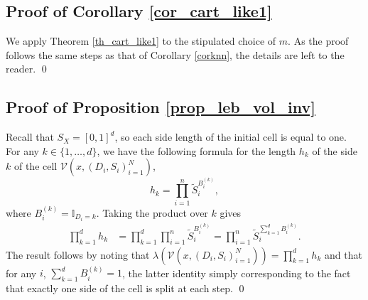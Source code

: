 \documentclass[paper=a4, fontsize=11pt]{scrartcl}
\newcommand{\diam}{\operatorname{diam}}
\begin{document}

\subsection*{Proof of Corollary \ref{cor_cart_like1}}
We apply Theorem \ref{th_cart_like1} to the stipulated choice of $m$. As the proof follows the same steps as that of Corollary \ref{corknn}, the details are left to the reader.
\qed

\subsection*{Proof of Proposition \ref{prop_leb_vol_inv}}

Recall that $S_X= [0,1] ^d$, so each side length of the initial cell is equal to one. For any $k\in \{1,\ldots,d\}$, we have the following formula for the length $h_k$ of the side $k$ of the cell $\mathcal V(x,(D_i,S_i)_{i=1}^N)$,
    \[
    h_k= \prod_{i=1}^n  \tilde S_i^{B_i^{(k)}},
    \]
    where $B_i^{(k)}=\mathbb{I}_{D_i=k}$. Taking the product over $k$ gives
    \begin{align*}
         \prod_{k=1}^d h_k 
         &= \prod_{k=1}^d \prod_{i=1}^n \tilde S_i^{B_i^{(k)}} 
         =  \prod_{i=1}^n \tilde S_i^{\sum_{k=1}^d B_i^{(k)}}.
    \end{align*}
    The result follows by noting that $\lambda(\mathcal V(x,(D_i,S_i)_{i=1}^N))=\prod_{k=1}^d h_k$ and that for any $i$, $\sum_{k=1}^d B_i^{(k)} = 1$, the latter identity simply corresponding to the fact that exactly one side of the cell is split at each step.
\qed
\end{document}
